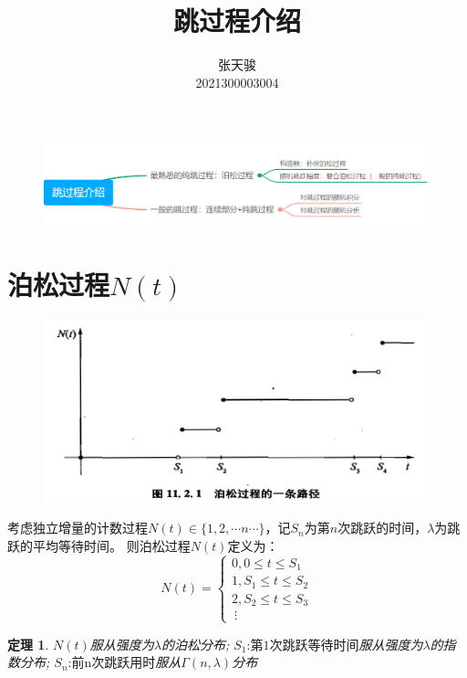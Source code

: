 \documentclass[a4paper, 12pt]{ctexart}
\author{张天骏 \\ 2021300003004}
\date{}
\title{跳过程介绍}
\newtheorem*{theorem}{定理}
\begin{document}
\maketitle

\newpage
\tableofcontents   

\section*{}
\section*{}
\begin{figure}[hb]
    \centering
    \includegraphics[width=0.8\linewidth]{pic/大纲.png}
    \nonumber
    \label{fig:enter-label}
\end{figure}


\newpage
\section{泊松过程$N(t)$}
\begin{figure}[h]
    \centering
    \includegraphics[width=0.8\linewidth]{pic/泊松.png}
    \nonumber
    \label{fig:enter-label}
\end{figure}
考虑独立增量的计数过程$N(t) \in \{ 1,2,\cdots n \cdots\}$，记$S_n$为第$n$次跳跃的时间，$\lambda$为跳跃的平均等待时间。
则泊松过程$N(t)$定义为：
$$N(t)=\begin{cases} 0,0 \leq t \leq S_1\\ 1,S_1 \leq t \leq S_2 \\ 2,S_2 \leq t \leq S_3 \\ \ \vdots \end{cases}$$

\begin{theorem}
     $N(t)$服从强度为$\lambda$的泊松分布;
     $S_1 \text{:第1次跳跃等待时间}$服从强度为$\lambda$的指数分布;
     $S_n \text{:前n次跳跃用时}$服从$\Gamma(n,\lambda)$分布
\end{theorem}
\end{document}
